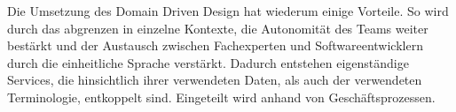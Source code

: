 Die Umsetzung des Domain Driven Design hat wiederum einige Vorteile. So wird durch das abgrenzen in einzelne Kontexte, die Autonomität des Teams weiter bestärkt und der Austausch zwischen Fachexperten und Softwareentwicklern durch die einheitliche Sprache verstärkt. Dadurch entstehen eigenständige Services, die hinsichtlich ihrer verwendeten Daten, als auch der verwendeten Terminologie, entkoppelt sind. Eingeteilt wird anhand von Geschäftsprozessen.